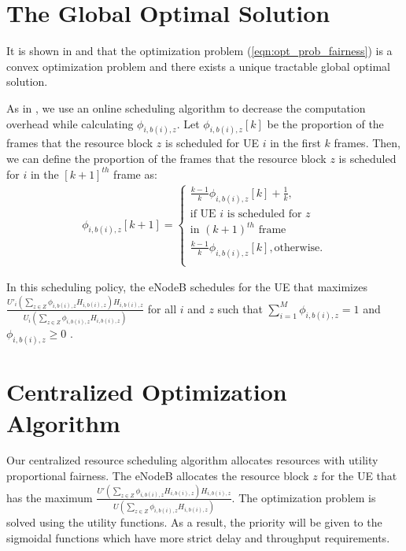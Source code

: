 \documentclass[journal]{IEEEtran} 				\IEEEoverridecommandlockouts 	\usepackage{amsmath,amssymb}
\begin{document}
\section{The Global Optimal Solution}\label{sec:Proof}

It is shown in \cite{Ahmed_Utility2} and \cite{Ahmed_Utility3} that the optimization problem (\ref{eqn:opt_prob_fairness}) is a convex optimization problem and there exists a unique tractable global optimal solution. 

As in \cite{SelfOrganizedLTE}, we use an online scheduling algorithm to decrease the computation overhead while calculating $\phi_{i,b(i),z}$. Let $\phi_{i,b(i),z}[k]$ be the proportion of the frames that the resource block $z$ is scheduled for UE $i$ in the first $k$ frames. Then, we can define the proportion of the frames that the resource block $z$ is scheduled for $i$ in the $[k+1]^{th}$ frame as:
\begin{equation*}\label{eqn:online_algorithm}
\begin{aligned}
\phi_{i,b(i),z}[k+1]=
\begin{cases}
	\frac{k-1}{k}\phi_{i,b(i),z}[k]+\frac{1}{k},\\ 
	\text{if UE $i$ is scheduled for $z$}\\
	\text{in $(k+1)^{th}$ frame}\\
	\frac{k-1}{k}\phi_{i,b(i),z}[k],\text{otherwise}.\\
\end{cases}
\end{aligned}
\end{equation*}

In this scheduling policy, the eNodeB schedules for the UE that maximizes $\frac{U'_i(\sum_{z \in Z}\phi_{i,b(i),z}H_{i,b(i),z})H_{i,b(i),z}}{U_i(\sum_{z \in Z}\phi_{i,b(i),z}H_{i,b(i),z})}$ for all $i$ and $z$ such that $\sum_{i=1}^{M}\phi_{i,b(i),z}=1$ and $\phi_{i,b(i),z} \geq 0$ \cite{Erpek}.
  


\section{Centralized Optimization Algorithm}\label{sec:Algorithm}
Our centralized resource scheduling algorithm allocates resources with utility proportional fairness. The eNodeB allocates the resource block $z$ for the UE that has the maximum $\frac{U'(\sum_{z \in Z}\phi_{i,b(i),z}H_{i,b(i),z})H_{i,b(i),z}}{ U(\sum_{z \in Z}\phi_{i,b(i),z}H_{i,b(i),z})}$. The optimization problem is solved using the utility functions. As a result, the priority will be given to the sigmoidal functions which have more strict delay and throughput requirements. 
\end{document}
